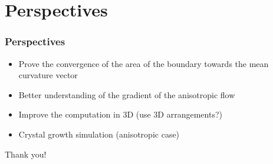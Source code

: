\documentclass{beamer}
\begin{document}
\section{Perspectives}

\begin{frame}
    \frametitle{Perspectives}

    \begin{itemize}
        \item Prove the convergence of the area of the boundary towards the mean
            curvature vector
        \item Better understanding of the gradient of the anisotropic flow
        \item Improve the computation in 3D (use 3D arrangements?)
        \item Crystal growth simulation (anisotropic case)
    \end{itemize}
\end{frame}

\begin{frame}
    \begin{center}
        \huge{Thank you!}
    \end{center}
\end{frame}
\end{document}
